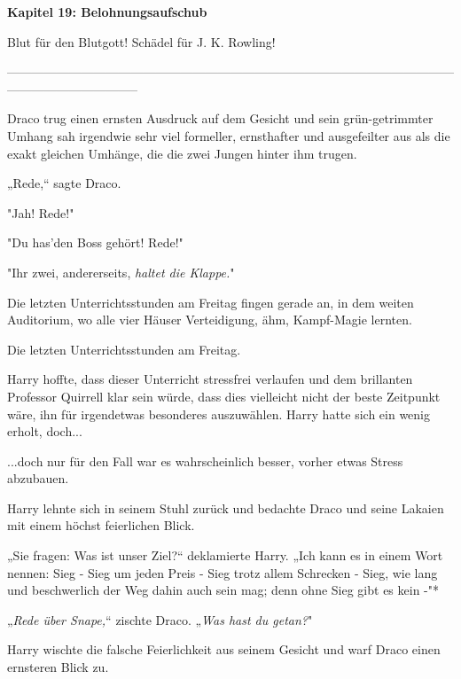 

\hypertarget{belohnungsaufschub}{%

\textbf{Kapitel 19: Belohnungsaufschub\\ }

\hfill\break Blut für den Blutgott! Schädel für J. K. Rowling!

--------------------------------------------------------------------------------------------------------------------------------------------

\hfill\break Draco trug einen ernsten Ausdruck auf dem Gesicht und sein grün-getrimmter Umhang sah irgendwie sehr viel formeller, ernsthafter und ausgefeilter aus als die exakt gleichen Umhänge, die die zwei Jungen hinter ihm trugen.

„Rede,“ sagte Draco.

"Jah! Rede!"

"Du has'den Boss gehört! Rede!"

"Ihr zwei, andererseits, \emph{haltet die Klappe.}"

Die letzten Unterrichtsstunden am Freitag fingen gerade an, in dem weiten Auditorium, wo alle vier Häuser Verteidigung, ähm, Kampf-Magie lernten.

Die letzten Unterrichtsstunden am Freitag.

Harry hoffte, dass dieser Unterricht stressfrei verlaufen und dem brillanten Professor Quirrell klar sein würde, dass dies vielleicht nicht der beste Zeitpunkt wäre, ihn für irgendetwas besonderes auszuwählen. Harry hatte sich ein wenig erholt, doch...

...doch nur für den Fall war es wahrscheinlich besser, vorher etwas Stress abzubauen.

Harry lehnte sich in seinem Stuhl zurück und bedachte Draco und seine Lakaien mit einem höchst feierlichen Blick.

„Sie fragen: Was ist unser Ziel?“ deklamierte Harry. „Ich kann es in einem Wort nennen: Sieg - Sieg um jeden Preis - Sieg trotz allem Schrecken - Sieg, wie lang und beschwerlich der Weg dahin auch sein mag; denn ohne Sieg gibt es kein -"*

„\emph{Rede über Snape,}“ zischte Draco. „\emph{Was hast du getan?}"

Harry wischte die falsche Feierlichkeit aus seinem Gesicht und warf Draco einen ernsteren Blick zu.

}
